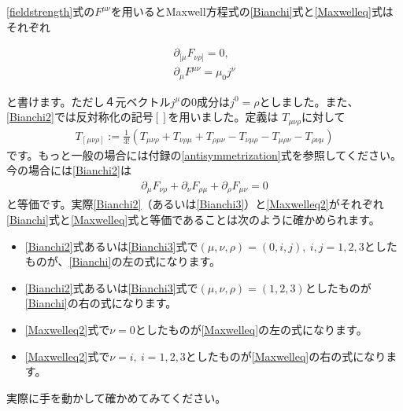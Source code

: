 \documentclass[report,paper=a4, fontsize=12pt, line_length=16cm, number_of_lines=33,dvipdfmx]{jlreq}
\newenvironment{important}{\begin{tcolorbox}[
  colback = white,
  colframe = red!35,
  boxrule = 2mm,
  fonttitle = \bfseries,
  after = \noindent] }{\end{tcolorbox}}
\numberwithin{equation}{chapter}
\newcommand{\del}{\partial}
\begin{document}
\eqref{fieldstrength}式の$F^{\mu\nu}$を用いるとMaxwell方程式の\eqref{Bianchi}式と\eqref{Maxwelleq}式はそれぞれ
\begin{important}
  \begin{align}
    \del_{[\mu}F_{\nu\rho]} =0,\label{Bianchi2}\\
    \del_{\mu}F^{\mu\nu}=\mu_0j^{\nu}\label{Maxwelleq2}
  \end{align}    
\end{important}
と書けます。ただし４元ベクトル$j^{\mu}$の$0$成分は$j^0=\rho$としました。また、\eqref{Bianchi2}では反対称化の記号$[]$を用いました。定義は
$T_{\mu\nu\rho}$に対して
\begin{align}
  T_{[\mu\nu\rho]}:=\frac{1}{3!}(T_{\mu\nu\rho}+T_{\nu\rho\mu}+T_{\rho\mu\nu}-T_{\nu\mu\rho}-T_{\mu\rho\nu}-T_{\rho\nu\mu})
\end{align}
です。もっと一般の場合には付録の\eqref{antisymmetrization}式を参照してください。今の場合には\eqref{Bianchi2}は
\begin{align}
  \del_{\mu}F_{\nu\rho}+\del_{\nu}F_{\rho\mu}+\del_{\rho}F_{\mu\nu}=0\label{Bianchi3}
\end{align}
と等価です。実際\eqref{Bianchi2}（あるいは\eqref{Bianchi3}）と\eqref{Maxwelleq2}がそれぞれ\eqref{Bianchi}式と\eqref{Maxwelleq}式と等価であることは次のように確かめられます。
\begin{itemize}
  \item \eqref{Bianchi2}式あるいは\eqref{Bianchi3}式で$(\mu,\nu,\rho)=(0,i,j),\ i,j=1,2,3$としたものが、\eqref{Bianchi}の左の式になります。
  \item \eqref{Bianchi2}式あるいは\eqref{Bianchi3}式で$(\mu,\nu,\rho)=(1,2,3)$としたものが\eqref{Bianchi}の右の式になります。
  \item \eqref{Maxwelleq2}式で$\nu=0$としたものが\eqref{Maxwelleq}の左の式になります。  
  \item \eqref{Maxwelleq2}式で$\nu=i,\ i=1,2,3$としたものが\eqref{Maxwelleq}の右の式になります。
\end{itemize}
実際に手を動かして確かめてみてください。
\end{document}
